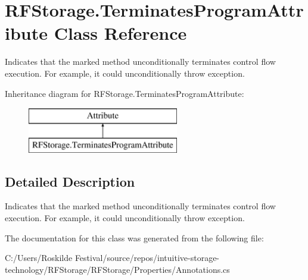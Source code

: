 \hypertarget{class_r_f_storage_1_1_terminates_program_attribute}{}\section{R\+F\+Storage.\+Terminates\+Program\+Attribute Class Reference}
\label{class_r_f_storage_1_1_terminates_program_attribute}


Indicates that the marked method unconditionally terminates control flow execution. For example, it could unconditionally throw exception.  


Inheritance diagram for R\+F\+Storage.\+Terminates\+Program\+Attribute\+:\begin{figure}[H]
\begin{center}
\leavevmode
\includegraphics[height=2.000000cm]{class_r_f_storage_1_1_terminates_program_attribute}
\end{center}
\end{figure}


\subsection{Detailed Description}
Indicates that the marked method unconditionally terminates control flow execution. For example, it could unconditionally throw exception. 



The documentation for this class was generated from the following file\+:\begin{DoxyCompactItemize}
\item 
C\+:/\+Users/\+Roskilde Festival/source/repos/intuitive-\/storage-\/technology/\+R\+F\+Storage/\+R\+F\+Storage/\+Properties/Annotations.\+cs\end{DoxyCompactItemize}
